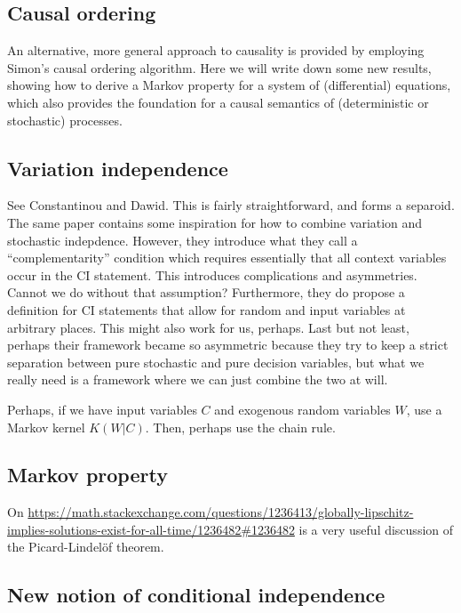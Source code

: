 \subsection{Causal ordering}

\label{sec:causal_ordering}

An alternative, more general approach to causality is provided by employing Simon's causal ordering algorithm.
Here we will write down some new results, showing how to derive a Markov property for a system of (differential) equations, which also provides the foundation for a causal semantics of (deterministic or stochastic) processes.

\subsection{Variation independence}

See Constantinou and Dawid. This is fairly straightforward, and forms a separoid.
The same paper contains some inspiration for how to combine variation and stochastic indepdence.
However, they introduce what they call a ``complementarity'' condition which requires essentially that all context variables occur in the CI statement. This introduces complications and asymmetries. Cannot we do without that assumption?
Furthermore, they do propose a definition for CI statements that allow for random and input variables at arbitrary places.
This might also work for us, perhaps. 
Last but not least, perhaps their framework became so asymmetric because they try to keep a strict separation between pure stochastic and pure decision variables, but what we really need is a framework where we can just combine the two at will.

Perhaps, if we have input variables $C$ and exogenous random variables $W$, use a Markov kernel $K(W|C)$. Then, perhaps use the chain rule.

\subsection{Markov property}

On \url{https://math.stackexchange.com/questions/1236413/globally-lipschitz-implies-solutions-exist-for-all-time/1236482\#1236482} is a very useful discussion of the Picard-Lindel\"of theorem. 

\subsection{New notion of conditional independence}

